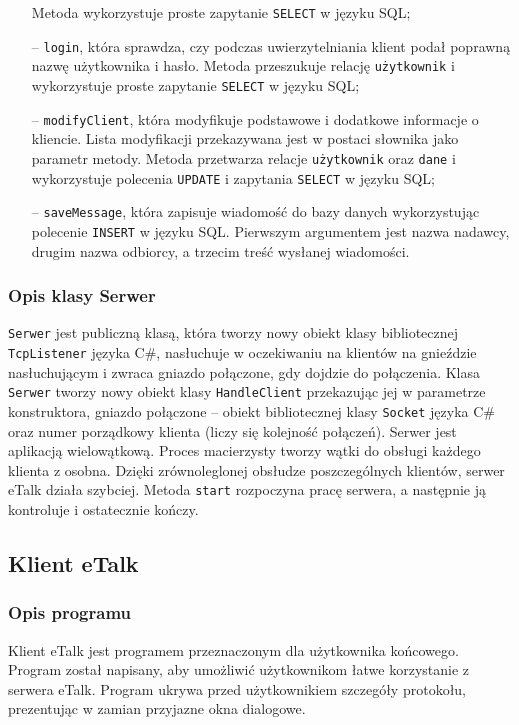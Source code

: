 \documentclass[a4paper,12pt]{article}
\begin{document}
\begin{itemize}
              Metoda wykorzystuje proste zapytanie \texttt{SELECT} w języku SQL;
    \item[--] \texttt{login}, która sprawdza, czy podczas uwierzytelniania klient podał poprawną nazwę użytkownika i hasło. Metoda przeszukuje relację \texttt{użytkownik} i wykorzystuje proste zapytanie \texttt{SELECT} w języku SQL;
    \item[--] \texttt{modifyClient}, która modyfikuje podstawowe i dodatkowe informacje o kliencie. Lista modyfikacji przekazywana jest w postaci słownika jako parametr metody.
        Metoda przetwarza relacje \texttt{użytkownik} oraz \texttt{dane} i wykorzystuje polecenia \texttt{UPDATE} i zapytania \texttt{SELECT} w języku SQL;
    \item[--] \texttt{saveMessage}, która zapisuje wiadomość do bazy danych wykorzystując polecenie \texttt{INSERT} w języku SQL.
              Pierwszym argumentem jest nazwa nadawcy, drugim nazwa odbiorcy, a trzecim treść wysłanej wiadomości.
\end{itemize}

\subsubsection[Opis klasy Serwer]{Opis klasy Serwer}
\texttt{Serwer} jest publiczną klasą, która tworzy nowy obiekt klasy bibliotecznej \texttt{TcpListener} języka C\#, nasłuchuje w oczekiwaniu na klientów na gnieździe nasłuchującym i zwraca gniazdo połączone, gdy dojdzie do połączenia.
Klasa \texttt{Serwer} tworzy nowy obiekt klasy \texttt{HandleClient} przekazując jej w parametrze konstruktora, gniazdo połączone -- obiekt bibliotecznej klasy \texttt{Socket} języka C\# oraz numer porządkowy klienta (liczy się kolejność połączeń). Serwer jest aplikacją wielowątkową. Proces macierzysty tworzy wątki do obsługi każdego klienta z osobna. Dzięki zrównoleglonej obsłudze poszczególnych klientów, serwer eTalk działa szybciej. Metoda \texttt{start} rozpoczyna pracę serwera, a następnie ją kontroluje i ostatecznie kończy.


\subsection[Klient eTalk]{Klient eTalk}
\subsubsection[Opis programu]{Opis programu}

Klient eTalk jest programem przeznaczonym dla użytkownika końcowego. Program został napisany, aby umożliwić użytkownikom  łatwe korzystanie z serwera eTalk. Program ukrywa przed użytkownikiem  szczegóły protokołu, prezentując w zamian przyjazne okna dialogowe.
\end{document}
